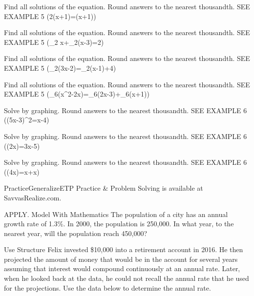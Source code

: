 \documentclass{article}
\newenvironment{practice}[2]{}{}        %
\newenvironment{te-addendum}[2]{}{}     %
\newcommand{\answer}[1]{}               %
\newcommand{\placeholder}[2]{}          %
\begin{document}
\begin{practice}{34}{1}
Find all solutions of the equation. Round answers to the nearest thousandth. SEE EXAMPLE 5
(2\log(x+1)=\log(x+1))
\answer{0; -1 (extraneous)}
\end{practice}
\begin{practice}{35}{1}
Find all solutions of the equation. Round answers to the nearest thousandth. SEE EXAMPLE 5
(\log_2 x+\log_2(x-3)=2)
\answer{4; -1 (extraneous)}
\end{practice}
\begin{practice}{36}{1}
Find all solutions of the equation. Round answers to the nearest thousandth. SEE EXAMPLE 5
(\log_2(3x-2)=\log_2(x-1)+4)
\answer{1.077}
\end{practice}
\begin{practice}{37}{1}
Find all solutions of the equation. Round answers to the nearest thousandth. SEE EXAMPLE 5
(\log_6(x^2-2x)=\log_6(2x-3)+\log_6(x+1))
\answer{1.303 (extraneous); -2.303 (extraneous)}
\end{practice}
\begin{practice}{38}{2}
Solve by graphing. Round answers to the nearest thousandth. SEE EXAMPLE 6
(\log(5x-3)^2=x-4)
\answer{(x\approx6.063)}
\end{practice}
\begin{practice}{39}{2}
Solve by graphing. Round answers to the nearest thousandth. SEE EXAMPLE 6
(\ln(2x)=3x-5)
\answer{(x\approx0.003) and (x\approx2.153)}
\end{practice}
\begin{practice}{40}{2}
Solve by graphing. Round answers to the nearest thousandth. SEE EXAMPLE 6
(\log(4x)=x+\log x)
\answer{(x\approx0.602)}
\end{practice}
\begin{te-addendum}{Practice}{GeneralizeETP}
Practice \& Problem Solving is available at SavvasRealize.com.
\end{te-addendum}
\begin{practice}{41}{2}
APPLY. Model With Mathematics The population of a city has an annual growth rate of 1.3\%. In 2000, the population is 250,000. In what year, to the nearest year, will the population reach 450,000?
\answer{The city will have a population of 450,000 in 2045}
\end{practice}
\begin{practice}{42}{2}
Use Structure Felix invested \$10,000 into a retirement account in 2016. He then projected the amount of money that would be in the account for several years assuming that interest would compound continuously at an annual rate. Later, when he looked back at the data, he could not recall the annual rate that he used for the projections. Use the data below to determine the annual rate.
\placeholder{diagram}{Four green banknote columns sharing a baseline, labeled by year and amount: 2016, \$10,000; 2022, \$15,038; 2025, \$18,441; 2041, \$54,739. Heights increase from left to right.}
\answer{6.8\%}
\end{practice}
\end{document}
